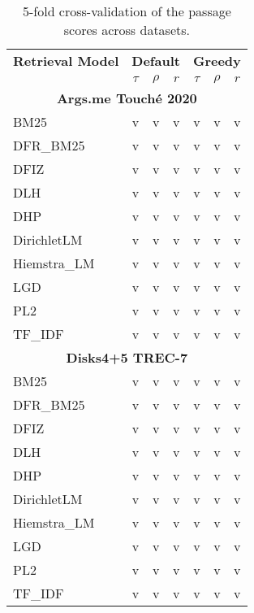 \pagebreak
\begin{longtable}{lcccccc}
    \caption{5-fold cross-validation of the passage scores across datasets.} \\
    \toprule
    \textbf{Retrieval Model} & \multicolumn{3}{c}{\textbf{Default}} & \multicolumn{3}{c}{\textbf{Greedy}} \\
    \cmidrule(lr){2-4} \cmidrule(lr){5-7}
                            & $\tau$ & $\rho$ & $r$ & $\tau$ & $\rho$ & $r$ \\
    \midrule

    \multicolumn{7}{c}{\textbf{Args.me Touché 2020}} \\
    BM25         & v & v & v & v & v & v \\
    DFR\_BM25    & v & v & v & v & v & v \\
    DFIZ         & v & v & v & v & v & v \\
    DLH          & v & v & v & v & v & v \\
    DHP          & v & v & v & v & v & v \\
    DirichletLM  & v & v & v & v & v & v \\
    Hiemstra\_LM & v & v & v & v & v & v \\
    LGD          & v & v & v & v & v & v \\
    PL2          & v & v & v & v & v & v \\
    TF\_IDF      & v & v & v & v & v & v \\
    \midrule

    \multicolumn{7}{c}{\textbf{Disks4+5 TREC-7}} \\
    BM25         & v & v & v & v & v & v \\
    DFR\_BM25    & v & v & v & v & v & v \\
    DFIZ         & v & v & v & v & v & v \\
    DLH          & v & v & v & v & v & v \\
    DHP          & v & v & v & v & v & v \\
    DirichletLM  & v & v & v & v & v & v \\
    Hiemstra\_LM & v & v & v & v & v & v \\
    LGD          & v & v & v & v & v & v \\
    PL2          & v & v & v & v & v & v \\
    TF\_IDF      & v & v & v & v & v & v \\
    \midrule


\end{longtable}
